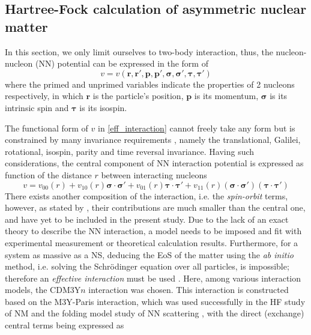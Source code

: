 \subsection{Hartree-Fock calculation of asymmetric nuclear matter}%
\label{sec:hartree_fock_calculation_of_asymmetric_nuclear_matter}

In this section, we only limit ourselves to two-body interaction, thus, the nucleon-nucleon (\gls{NN}) potential can be expressed in the form of
\begin{equation}
        v = v(\bm{r}, \bm{r'}, \bm{p}, \bm{p'}, \bm{\sigma}, \bm{\sigma'}, \bm{\tau}, \bm{\tau'})
        \label{eff_interaction}
\end{equation}
where the primed and unprimed variables indicate the properties of 2 nucleons respectively, in which $\bm{r}$ is the particle's position, $\bm{p}$ is its momentum, $\bm{\sigma}$ is its intrinsic spin and $\bm{\tau}$ is its isospin.\par
The functional form of $v$ in \eqref{eff_interaction} cannot freely take any form but is constrained by many invariance requirements \citep{greiner1996nuclear}, namely the translational, Galilei, rotational, isospin, parity and time reversal invariance. Having such considerations, the central component of \gls{NN} interaction potential is expressed as function of the distance $r$ between interacting nucleons
\begin{equation}
        v = v_{00}(r) + v_{10}(r) \bm{\sigma}\cdot\bm{\sigma'} + v_{01}(r) \bm{\tau}\cdot\bm{\tau'} + v_{11}(r) (\bm{\sigma}\cdot\bm{\sigma'})(\bm{\tau}\cdot\bm{\tau'})
\end{equation}
There exists another composition of the interaction, i.e. the \emph{spin-orbit} terms, however, as stated by \cite{vidana2016role}, their contributions are much smaller than the central one, and have yet to be included in the present study. Due to the lack of an exact theory to describe the \gls{NN} interaction, a model needs to be imposed and fit with experimental measurement or theoretical calculation results. Furthermore, for a system as massive as a \gls{NS}, deducing the \gls{EoS} of the matter using the \emph{ab initio} method, i.e. solving the Schr\"{o}dinger equation over all particles, is impossible; therefore an \emph{effective interaction} must be used \citep{greiner1996nuclear}. Here, among various interaction models, the CDM3Y$n$ interaction was chosen. This interaction is constructed based on the M3Y-Paris interaction, which was used successfully in the \gls{HF} study of \gls{NM} \citep{loan2011equation, tan2016mean, tan2020spin,tan2021equation} and the folding model study of \gls{NN} scattering \citep{khoa1997nuclear,khoa2000generalized}, with the direct (exchange) central terms being expressed as
